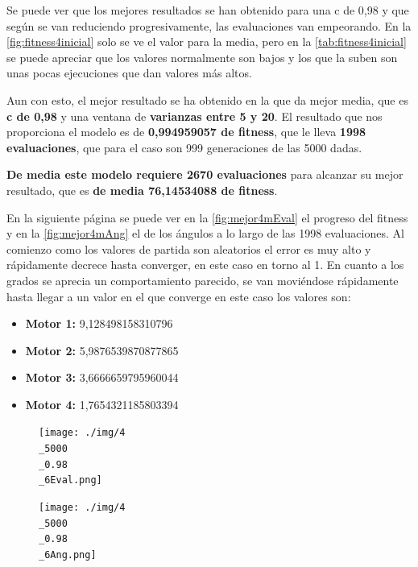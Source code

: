 \documentclass[12pt, spanish, pdftex]{UC3M_document}
\begin{document}
Se puede ver que los mejores resultados se han obtenido para una c de 0,98 y que según se van reduciendo progresivamente, las evaluaciones van empeorando. En la \autoref{fig:fitness4inicial} solo se ve el valor para la media, pero en la \autoref{tab:fitness4inicial} se puede apreciar que los valores normalmente son bajos y los que la suben son unas pocas ejecuciones que dan valores más altos. 

Aun con esto, el mejor resultado se ha obtenido en la que da mejor media, que es \textbf{c de 0,98} y una ventana de \textbf{varianzas entre 5 y 20}. El resultado que nos proporciona el modelo es de \textbf{0,994959057 de fitness}, que le lleva \textbf{1998 evaluaciones}, que para el caso son 999 generaciones de las 5000 dadas. 

\textbf{De media este modelo requiere 2670 evaluaciones} para alcanzar su mejor resultado, que es \textbf{de media 76,14534088 de fitness}.

En la siguiente página se puede ver en la \autoref{fig:mejor4mEval} el progreso del fitness y en la \autoref{fig:mejor4mAng} el de los ángulos a lo largo de las 1998 evaluaciones. Al comienzo como los valores de partida son aleatorios el error es muy alto y rápidamente decrece hasta converger, en este caso en torno al 1. En cuanto a los grados se aprecia un comportamiento parecido, se van moviéndose rápidamente hasta llegar a un valor en el que converge en este caso los valores son:
\begin{itemize}
	\item \textbf{Motor 1:} 9,128498158310796
	\item \textbf{Motor 2:} 5,9876539870877865 
	\item \textbf{Motor 3:} 3,6666659795960044 
	\item \textbf{Motor 4:} 1,7654321185803394
\end{itemize}
\begin{figure}[H]
	{\texttt{[image: ./img/4\\\_5000\\\_0.98\\\_6Eval.png]}}
\end{figure}
\begin{figure}[H]
	{\texttt{[image: ./img/4\\\_5000\\\_0.98\\\_6Ang.png]}}
\end{figure}
\end{document}
